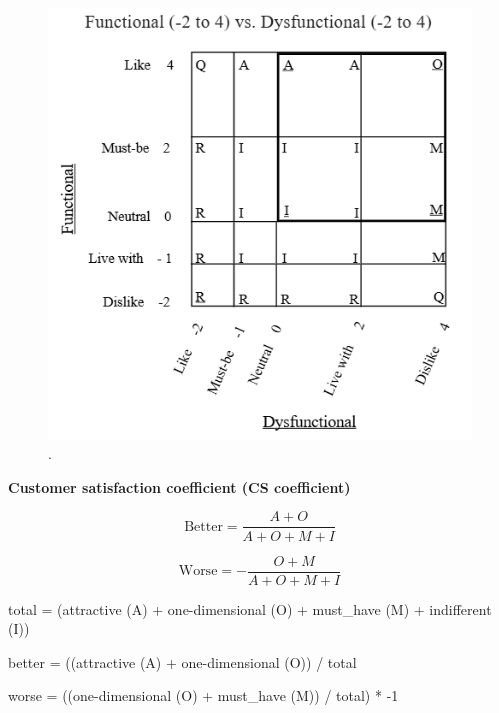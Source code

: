 \documentclass[../main.tex]{subfiles}
\begin{document}
\begin{figure}[H]
        \centering
        \includegraphics[scale=0.8]{img/3-background/kano/analysis.png}
        \caption{ \cite{berger1993kano}.}
        \label{fig:analysis}
\end{figure}

\textbf{Customer satisfaction coefficient (CS coefficient)}

\cite{timko1993}

\begin{equation}
    \text{Better} = \frac{A + O}{A + O + M + I}
\end{equation}

\begin{equation}
    \text{Worse} = - \frac{O + M }{A + O + M + I}
\end{equation}

total = (attractive (A) + one-dimensional (O) + must\_have (M) + indifferent (I))

better = ((attractive (A) + one-dimensional (O)) / total

worse = ((one-dimensional (O) + must\_have (M)) / total) * -1
\end{document}
